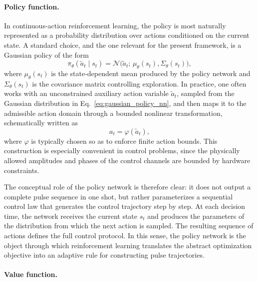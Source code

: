 \paragraph{Policy function.}
\label{subsubsec:policy_function}

In continuous-action reinforcement learning, the policy is most naturally represented as a probability distribution over actions conditioned on the current state. A standard choice, and the one relevant for the present framework, is a Gaussian policy of the form
\begin{equation}
\pi_{\theta}(\tilde a_t \mid s_t)
=
\mathcal{N}\!\bigl(\tilde a_t;\,\mu_{\theta}(s_t),\Sigma_{\theta}(s_t)\bigr),
\label{eq:gaussian_policy_nn}
\end{equation}
where \(\mu_{\theta}(s_t)\) is the state-dependent mean produced by the policy network and \(\Sigma_{\theta}(s_t)\) is the covariance matrix controlling exploration. In practice, one often works with an unconstrained auxiliary action variable \(\tilde a_t\), sampled from the Gaussian distribution in Eq.~\eqref{eq:gaussian_policy_nn}, and then maps it to the admissible action domain through a bounded nonlinear transformation, schematically written as
\begin{equation}
a_t = \varphi(\tilde a_t),
\label{eq:squashed_action_general}
\end{equation}
where \(\varphi\) is typically chosen so as to enforce finite action bounds. This construction is especially convenient in control problems, since the physically allowed amplitudes and phases of the control channels are bounded by hardware constraints.

The conceptual role of the policy network is therefore clear: it does not output a complete pulse sequence in one shot, but rather parameterizes a sequential control law that generates the control trajectory step by step. At each decision time, the network receives the current state \(s_t\) and produces the parameters of the distribution from which the next action is sampled. The resulting sequence of actions defines the full control protocol. In this sense, the policy network is the object through which reinforcement learning translates the abstract optimization objective into an adaptive rule for constructing pulse trajectories.

\paragraph{Value function.}
\label{subsubsec:value_function}


